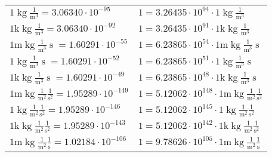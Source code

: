 \begin{center}
\begin{longtable}{l l}
{\color{black}$1 \bm{\mathrm{ }}\operatorname{kg}\frac1{\operatorname{m}^3}{}{}{} = 3.06340\cdot10^{-95} $}   & {\color{black}$ 1 = 3.26435\cdot10^{94} \cdot 1 \bm{\mathrm{ }}\operatorname{kg}\frac1{\operatorname{m}^3}{}{}{}$}  \\
{\color{gray}$1 \bm{\mathrm{ k}}\operatorname{kg}\frac1{\operatorname{m}^3}{}{}{} = 3.06340\cdot10^{-92} $}   & {\color{gray}$ 1 = 3.26435\cdot10^{91} \cdot 1 \bm{\mathrm{ k}}\operatorname{kg}\frac1{\operatorname{m}^3}{}{}{}$}  \\
{\color{gray}$1 \bm{\mathrm{ m}}\operatorname{kg}\frac1{\operatorname{m}^3}{\operatorname{s}}{}{} = 1.60291\cdot10^{-55} $}   & {\color{gray}$ 1 = 6.23865\cdot10^{54} \cdot 1 \bm{\mathrm{ m}}\operatorname{kg}\frac1{\operatorname{m}^3}{\operatorname{s}}{}{}$}  \\
{\color{black}$1 \bm{\mathrm{ }}\operatorname{kg}\frac1{\operatorname{m}^3}{\operatorname{s}}{}{} = 1.60291\cdot10^{-52} $}   & {\color{black}$ 1 = 6.23865\cdot10^{51} \cdot 1 \bm{\mathrm{ }}\operatorname{kg}\frac1{\operatorname{m}^3}{\operatorname{s}}{}{}$}  \\
{\color{gray}$1 \bm{\mathrm{ k}}\operatorname{kg}\frac1{\operatorname{m}^3}{\operatorname{s}}{}{} = 1.60291\cdot10^{-49} $}   & {\color{gray}$ 1 = 6.23865\cdot10^{48} \cdot 1 \bm{\mathrm{ k}}\operatorname{kg}\frac1{\operatorname{m}^3}{\operatorname{s}}{}{}$}  \\
{\color{gray}$1 \bm{\mathrm{ m}}\operatorname{kg}\frac1{\operatorname{m}^2}\frac1{\operatorname{s}^2}{}{} = 1.95289\cdot10^{-149} $}   & {\color{gray}$ 1 = 5.12062\cdot10^{148} \cdot 1 \bm{\mathrm{ m}}\operatorname{kg}\frac1{\operatorname{m}^2}\frac1{\operatorname{s}^2}{}{}$}  \\
{\color{black}$1 \bm{\mathrm{ }}\operatorname{kg}\frac1{\operatorname{m}^2}\frac1{\operatorname{s}^2}{}{} = 1.95289\cdot10^{-146} $}   & {\color{black}$ 1 = 5.12062\cdot10^{145} \cdot 1 \bm{\mathrm{ }}\operatorname{kg}\frac1{\operatorname{m}^2}\frac1{\operatorname{s}^2}{}{}$}  \\
{\color{gray}$1 \bm{\mathrm{ k}}\operatorname{kg}\frac1{\operatorname{m}^2}\frac1{\operatorname{s}^2}{}{} = 1.95289\cdot10^{-143} $}   & {\color{gray}$ 1 = 5.12062\cdot10^{142} \cdot 1 \bm{\mathrm{ k}}\operatorname{kg}\frac1{\operatorname{m}^2}\frac1{\operatorname{s}^2}{}{}$}  \\
{\color{gray}$1 \bm{\mathrm{ m}}\operatorname{kg}\frac1{\operatorname{m}^2}\frac1{\operatorname{s}}{}{} = 1.02184\cdot10^{-106} $}   & {\color{gray}$ 1 = 9.78626\cdot10^{105} \cdot 1 \bm{\mathrm{ m}}\operatorname{kg}\frac1{\operatorname{m}^2}\frac1{\operatorname{s}}{}{}$}  \\

\end{longtable}
\end{center}

